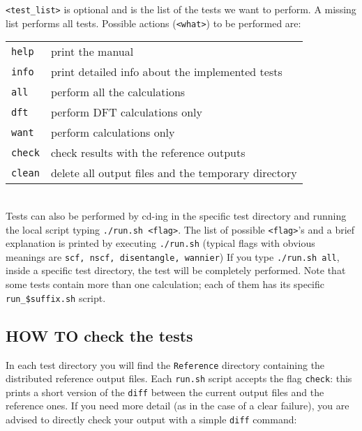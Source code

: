      \noindent
     {\tt <test\_list>} is optional and is the list of the tests we want to
     perform. A missing list performs all tests.
     Possible actions ({\tt <what>}) to be performed are: \\

     \begin{tabular}{ll}
{\tt help}     &       print the manual  \\
{\tt info}     &       print detailed info about the implemented tests \\
{\tt all}      &       perform all the calculations \\
{\tt dft}      &       perform DFT calculations only \\
{\tt want}     &       perform \WANT{} calculations only \\
{\tt check}    &       check results with the reference outputs \\
{\tt clean}    &       delete all output files and the temporary directory \\
\end{tabular}
%
%
\\

     \noindent
     Tests can also be performed
     by cd-ing in the specific test directory and running the local script
     typing {\tt ./run.sh <flag>}.
     The list of possible {\tt <flag>}'s and a brief explanation is printed by
     executing {\tt ./run.sh} (typical flags with obvious meanings are
     {\tt scf, nscf, disentangle, wannier})
     If you type {\tt ./run.sh all}, inside a specific
     test directory, the test will be completely performed.
     Note that some tests contain more than one \WANT{} calculation; each of them
     has its specific {\tt run\_\$suffix.sh} script.

\subsection*{HOW TO check the tests}
%
     In each test directory you will find the {\tt Reference} directory
     containing the distributed reference output files.
     Each {\tt run.sh} script accepts the flag {\tt check}: this
     prints a short version of the {\tt diff} between the current output files and
     the reference ones.
     If you need more detail (as in the case of a clear failure), you are advised
     to directly check your output with a simple {\tt diff} command: \\

